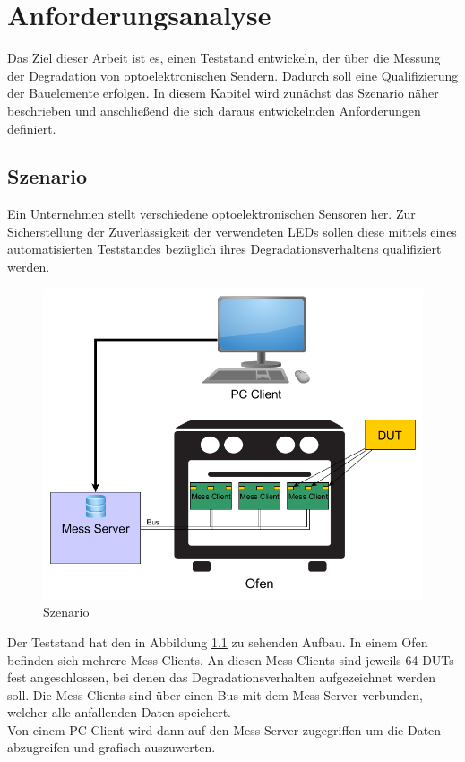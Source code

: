 
\chapter{Anforderungsanalyse}
\label{chapter_Anforderungsanalyse}
Das Ziel dieser Arbeit ist es, einen Teststand entwickeln, der über die Messung der Degradation von optoelektronischen Sendern. Dadurch soll eine Qualifizierung der Bauelemente erfolgen. In diesem Kapitel wird zunächst das Szenario näher beschrieben und anschließend die sich daraus entwickelnden Anforderungen definiert.

\section{Szenario}
Ein Unternehmen stellt verschiedene optoelektronischen Sensoren her. Zur Sicherstellung der Zuverlässigkeit der verwendeten \acp{LED} sollen diese mittels eines automatisierten Teststandes bezüglich ihres Degradationsverhaltens qualifiziert werden.


\begin{figure}[H]
\begin{center}
\includegraphics[scale=0.5]{img/general/Szenario.png}
\caption{Szenario}
\label{figure_Szenario}
\end{center}
\end{figure}

Der Teststand hat den in Abbildung \ref{figure_Szenario} zu sehenden Aufbau.
In einem Ofen befinden sich mehrere Mess-Clients. An diesen Mess-Clients sind jeweils 64 \acp{DUT} fest angeschlossen, bei denen das Degradationsverhalten aufgezeichnet werden soll.
Die Mess-Clients sind über einen Bus mit dem Mess-Server verbunden, welcher alle anfallenden Daten speichert.\\
Von einem PC-Client wird dann auf den Mess-Server zugegriffen um die Daten abzugreifen und grafisch auszuwerten.\\


